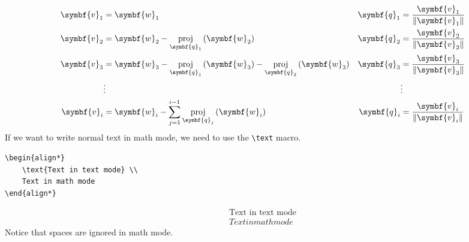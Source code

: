 \documentclass[11pt, twoside]{article}
\DeclareMathOperator{\proj}{proj}
\begin{document}
\begin{align*}
    \symbf{v}_1 & = \symbf{w}_1                                                                                                   & \symbf{q}_1 & = \frac{\symbf{v}_1}{\norm{\symbf{v}_1}} \\
    \symbf{v}_2 & = \symbf{w}_2 - \proj_{\symbf{q}_1} \left( \symbf{w}_2 \right)                                                  & \symbf{q}_2 & = \frac{\symbf{v}_2}{\norm{\symbf{v}_2}} \\
    \symbf{v}_3 & = \symbf{w}_3 - \proj_{\symbf{q}_1} \left( \symbf{w}_3 \right) - \proj_{\symbf{q}_2} \left( \symbf{w}_3 \right) & \symbf{q}_3 & = \frac{\symbf{v}_3}{\norm{\symbf{v}_3}} \\
                & \vdots                                                                                                          &             & \vdots                                   \\
    \symbf{v}_i & = \symbf{w}_i - \sum_{j = 1}^{i - 1} \proj_{\symbf{q}_j} \left( \symbf{w}_i \right)                             & \symbf{q}_i & = \frac{\symbf{v}_i}{\norm{\symbf{v}_i}}
\end{align*}
If we want to write normal text in math mode, we need to use the \lstinline{\text} macro.
\begin{lstlisting}
\begin{align*}
    \text{Text in text mode} \\
    Text in math mode
\end{align*}
\end{lstlisting}
\begin{align*}
    \text{Text in text mode} \\
    Text in math mode
\end{align*}
Notice that spaces are ignored in math mode.
\end{document}
